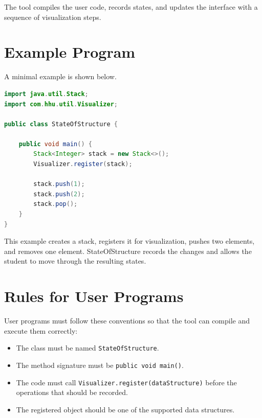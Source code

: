 \documentclass[12pt,a4paper]{article}
\begin{document}
The tool compiles the user code, records states, and updates the interface with a sequence of visualization steps.

\section{Example Program}

A minimal example is shown below.

\begin{lstlisting}[language=Java]
import java.util.Stack;
import com.hhu.util.Visualizer;

public class StateOfStructure {

    public void main() {
        Stack<Integer> stack = new Stack<>();
        Visualizer.register(stack);

        stack.push(1);
        stack.push(2);
        stack.pop();
    }
}
\end{lstlisting}

This example creates a stack, registers it for visualization, pushes two elements, and removes one element. StateOfStructure records the changes and allows the student to move through the resulting states.

\section{Rules for User Programs}

User programs must follow these conventions so that the tool can compile and execute them correctly:

\begin{itemize}[noitemsep]
    \item The class must be named \texttt{StateOfStructure}.
    \item The method signature must be \texttt{public void main()}.
    \item The code must call \texttt{Visualizer.register(dataStructure)} before the operations that should be recorded.
    \item The registered object should be one of the supported data structures.
\end{itemize}
\end{document}
